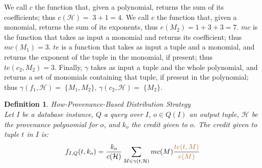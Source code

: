 \documentclass[preprint,12pt,sort&compress]{elsarticle}
\newcommand{\rone}[1]{\textcolor{reviewer1}{#1}}
\newtheorem{definition}{Definition}[section]
\newcommand{\eat}[1]{}
\newcommand{\scream}[1]{{\bf * #1 *}{\typeout{#1}}}
\begin{document}
We call $c$ the function that, given a polynomial, returns the sum of its coefficients; thus $c(\mathcal{H})=\;3+1=4$. 
\rone{We call $e$ the function that, given a monomial, returns the sum of its exponents, thus $e(M_2)=1+3+3=7$.}
$mc$ is the function that takes as input a monomial and returns its coefficient; thus $mc(M_1) = 3$. 
\rone{$te$ is a function that takes as input a tuple and a monomial, and returns the exponent of the tuple in the monomial, if present; thus $te(c_2, M_2)=3$}. 
Finally, $\gamma$ takes as input a tuple and the whole polynomial, and returns a set of monomials containing that tuple, if present in the polynomial; thus $\gamma(f_1, \mathcal{H})=\;\{M_1, M_2\}$, $\gamma(c_2, \mathcal{H})=\;\{M_2\}$. 

\eat{
More formally, consider the provenance polynomial $\mathcal{H} = H(Q, I, o)$ of a tuple $o$. We define: 
\begin{enumerate}
	\item $c(\mathcal{H}) = n$ the function $c: \mathbb{N}[TupleLoc] \mapsto \mathbb{N}$ that, given a polynomial, returns the sum of its coefficients;
	\item $c(M)$ the function $c: \mathcal{M} \mapsto \mathbb{N}$ that, given a monomial $M$, returns the sum of its exponents (with $\mathcal{M} \subset \mathbb{N}[TupleLoc]$ such that $\mathcal{M}$  is made only by the monomials $M$ in $\mathbb{N}[TupleLoc]$); 
	\item $e(t, M)$ the function $e: TupleLoc \times \mathcal{M} \mapsto \mathbb{N}$ that, given in input a tagged tuple and a monomial, returns the exponent of that tuple inside the monomial;
	\item $mc(M)$ the function $mc: \mathcal{M} \mapsto \mathbb{N}$ that, given in input one monomial, returns its coefficient;
	\item $\gamma(t, \mathcal{H})$ the function $\gamma: TupleLoc \times \mathbb{N}[TupleLoc] \mapsto \mathcal{M}$ that, given a tuple $t$ and a provenance polyomial $\mathcal{H}$, returns the (possibly empty) set of monomials $M$ in $\mathcal{H}$ such that $t$ appears in $M$.
\end{enumerate}
}
\begin{definition}{How-Provenance-Based Distribution Strategy}
    \label{def:how_distribution}\\
    Let $I$ be a database instance, $Q$ a query over $I$, $o \in Q(I)$ an output tuple, $\mathcal{H}$ be the provenance polynomial for $o$, and $k_o$ the credit given to $o$.
    The credit given to tuple $t$ in $I$ is:
    \[
    f_{I, Q}(t, k_o) = \frac{k_o}{c(\mathcal{H})} \sum_{M \in \gamma(t, \mathcal{H})} mc(M) \frac{\rone{te(t, M)}}{\rone{e(M)}}
    \]
\end{definition}
\end{document}
